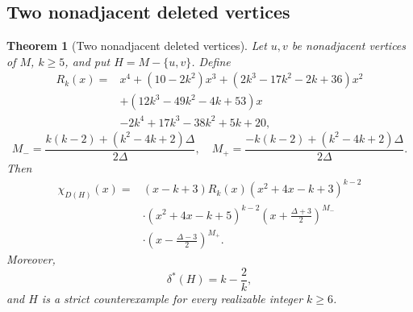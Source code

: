 \documentclass[a4paper,10pt,reqno]{amsart}
\theoremstyle{plain}
\newtheorem{theorem}{Theorem}[section]
\theoremstyle{definition}
\theoremstyle{remark}
\begin{document}
\subsection{Two nonadjacent deleted vertices}

\begin{theorem}[Two nonadjacent deleted vertices]\label{thm:nonadjacent-puncture}
Let \(u,v\) be nonadjacent vertices of \(M\), \(k\ge5\), and put
\(H=M-\{u,v\}\).  Define
\begin{align*}
R_k(x)={}&x^4+(10-2k^2)x^3+(2k^3-17k^2-2k+36)x^2\\
&+(12k^3-49k^2-4k+53)x\\
&-2k^4+17k^3-38k^2+5k+20,
\end{align*}
\[
 M_- =\frac{k(k-2)+(k^2-4k+2)\Delta}{2\Delta},
 \quad
 M_+ =\frac{-k(k-2)+(k^2-4k+2)\Delta}{2\Delta}.
\]
Then
\begin{align*}
\chi_{D(H)}(x)={}&(x-k+3)R_k(x)
 (x^2+4x-k+3)^{k-2}\\
&\cdot(x^2+4x-k+5)^{k-2}
 \left(x+\frac{\Delta+3}{2}\right)^{M_-}\\
&\cdot\left(x-\frac{\Delta-3}{2}\right)^{M_+}.
\end{align*}
Moreover,
\[
 \delta^*(H)=k-\frac2k,
\]
and \(H\) is a strict counterexample for every realizable integer \(k\ge6\).
\end{theorem}
\end{document}
